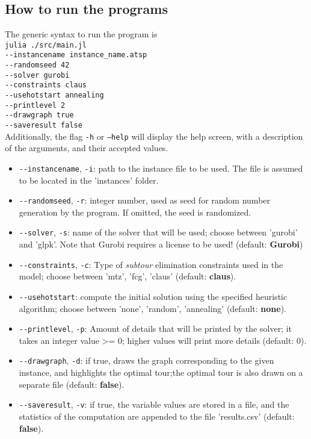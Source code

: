 \documentclass[
12pt,
a4paper,
oneside,
headinclude,
footinclude]{article}
\begin{document}
    \subsection{\textbf{How to run the programs}}
    The generic syntax to run the program is\\
    \-\quad\texttt{julia ./src/main.jl} \\
    \-\quad\quad\texttt{-{}-instancename instance\_name.atsp} \\
    \-\quad\quad\texttt{-{}-randomseed 42} \\
    \-\quad\quad\texttt{-{}-solver gurobi} \\
    \-\quad\quad\texttt{-{}-constraints claus} \\
    \-\quad\quad\texttt{-{}-usehotstart annealing} \\
    \-\quad\quad\texttt{-{}-printlevel 2} \\
    \-\quad\quad\texttt{-{}-drawgraph true} \\
    \-\quad\quad\texttt{-{}-saveresult false} \\
    
    Additionally, the flag \texttt{-h} or \texttt{--help} will display the help screen, with a description of the arguments, and their accepted values.
    
    \begin{itemize}
        \item \texttt{-{}-instancename}, \texttt{-i}: path to the instance file to be used. The file is assumed to be located in the 'instances' folder.
        \item \texttt{-{}-randomseed}, \texttt{-r}: integer number, used as seed for random number generation by the program. If omitted, the seed is randomized.
        \item \texttt{-{}-solver}, \texttt{-s}: name of the solver that will be used; choose between 'gurobi' and 'glpk'. Note that Gurobi requires a license to be used! (default: \textbf{Gurobi})
        \item \texttt{-{}-constraints}, \texttt{-c}: Type of \textit{subtour} elimination constraints used in the model; choose between 'mtz', 'fcg', 'claus' (default: \textbf{claus}).
        \item \texttt{-{}-usehotstart}: compute the initial solution using the specified heuristic algorithm; choose between 'none', 'random', 'annealing' (default: \textbf{none}).
        \item \texttt{-{}-printlevel}, \texttt{-p}: Amount of details that will be printed by the solver; it takes an integer value >= 0; higher values will print more details (default: \textbf{$0$}). 
        \item \texttt{-{}-drawgraph}, \texttt{-d}: if true, draws the graph corresponding to the given instance, and highlights the optimal tour;the optimal tour is also drawn on a separate file (default: \textbf{false}).
        \item \texttt{-{}-saveresult}, \texttt{-v}: if true, the variable values are stored in a file, and the statistics of the computation are appended to the file 'results.csv' (default: \textbf{false}).
    \end{itemize}
    
\end{document}

